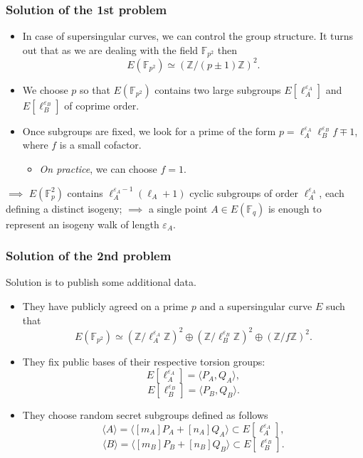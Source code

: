 \documentclass{beamer}
\begin{document}
\begin{frame}
\frametitle{Solution of the 1st problem}

	\begin{itemize}
		\item In case of \alert{supersingular} curves, we can control the group structure. It turns out that as we are dealing with the field $\mathbb{F}_{p^2}$ then
			\[ E(\mathbb{F}_{p^2}) \simeq (\mathbb{Z}/(p \pm 1)\mathbb{Z})^2. \]
			
		\item We choose $p$ so that $E(\mathbb{F}_{p^2})$ contains two large subgroups $E[\ell_A^{\varepsilon_A}]$ and $E[\ell_B^{\varepsilon_B}]$ of coprime order.
		
		\item Once subgroups are fixed, we look for a prime of the form $p = \ell_A^{\varepsilon_A} \ell_B^{\varepsilon_B}f \mp 1$, where $f$ is a small cofactor.
			\begin{itemize}
				\item \emph{On practice}, we can choose $f = 1$.
			\end{itemize}
	\end{itemize}
	$\implies$ $E(\mathbb{F}_p^2)$ contains $\ell_A^{\varepsilon_A - 1}(\ell_A + 1)$  cyclic subgroups of order $\ell_A^{\varepsilon_A}$, each defining a distinct isogeny; $\implies$ a single point $A \in E(\mathbb{F}_q)$ is enough to represent an isogeny walk of length $\varepsilon_A$.
	
\end{frame}

\begin{frame}
\frametitle{Solution of the 2nd problem}
	Solution is to publish some additional data.
	
	\begin{itemize}
		\item They have publicly agreed on a prime $p$ and a supersingular curve $E$ such that
			\[ E(\mathbb{F}_{p^2}) \simeq (\mathbb{Z}/\ell_A^{\varepsilon_A}\mathbb{Z})^2 \oplus (\mathbb{Z}/\ell_B^{\varepsilon_B}\mathbb{Z})^2 \oplus (\mathbb{Z}/f\mathbb{Z})^2. \]
		
		\item They fix public bases of their respective torsion groups:
		\[ E[\ell_A^{\varepsilon_A}] = \langle P_A, Q_A \rangle, \]
		\[ E[\ell_B^{\varepsilon_B}] = \langle P_B, Q_B \rangle. \]
		
		\item They choose random secret subgroups defined as follows
		\[ \langle A \rangle = \langle [m_A]P_A + [n_A]Q_A \rangle \subset E[\ell_A^{\varepsilon_A}], \]
		\[ \langle B \rangle = \langle [m_B]P_B +[n_B]Q_B \rangle \subset E[\ell_B^{\varepsilon_B}]. \]
		
		
	\end{itemize}

\end{frame}
\end{document}
